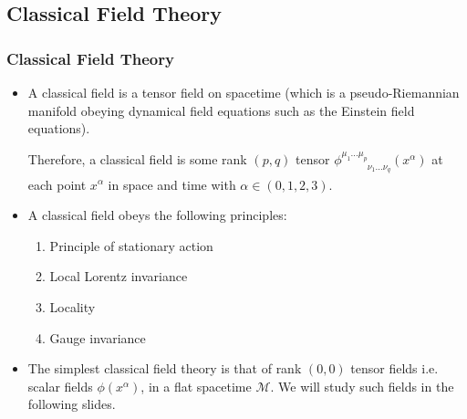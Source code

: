 \documentclass{beamer}
\begin{document}
\subsection{Classical Field Theory}

\begin{frame}
\frametitle{Classical Field Theory}

\begin{itemize}
\item A classical field is a tensor field on spacetime (which is a pseudo-Riemannian manifold obeying dynamical field equations such as the Einstein field equations).

Therefore, a classical field is some rank $\left( p, q \right)$ tensor $\phi^{\mu_1 \dots \mu_p}_{\phantom{\mu_1 \dots \mu_p} \nu_1 \dots \nu_q} \left( x^\alpha \right)$ at each point $x^\alpha$ in space and time with $\alpha \in \left( 0, 1, 2, 3 \right)$.

\item A classical field obeys the following principles:

\begin{enumerate}
\item Principle of stationary action

\item Local Lorentz invariance

\item Locality

\item Gauge invariance
\end{enumerate}

\item The simplest classical field theory is that of rank $\left( 0, 0 \right)$ tensor fields i.e. scalar fields $\phi \left( x^\alpha \right)$, in a flat spacetime $\mathcal{M}$. We will study such fields in the following slides.
\end{itemize}
\end{frame}
\end{document}
